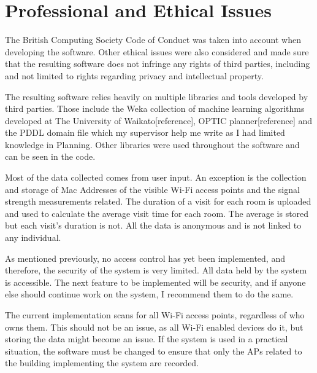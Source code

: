 \chapter{Professional and Ethical Issues}
The British Computing Society Code of Conduct was taken into account when developing the software. Other ethical issues were also considered and made sure that the resulting software does not infringe any rights of third parties, including and not limited to rights regarding privacy and intellectual property. 

The resulting software relies heavily on multiple libraries and tools developed by third parties. Those include the Weka collection of machine learning algorithms developed at The University of Waikato[reference], OPTIC planner[reference] and the PDDL domain file which my supervisor help me write as I had limited knowledge in Planning. Other libraries were used throughout the software and can be seen in the code. 

Most of the data collected comes from user input. An exception is the collection and storage of Mac Addresses of the visible Wi-Fi access points and the signal strength measurements related. The duration of a visit for each room is uploaded and used to calculate the average visit time for each room. The average is stored but each visit's duration is not. All the data is anonymous and is not linked to any individual. 

As mentioned previously, no access control has yet been implemented, and therefore, the security of the system is very limited. All data held by the system is accessible. The next feature to be implemented will be security, and if anyone else should continue work on the system, I recommend them to do the same.

The current implementation scans for all Wi-Fi access points, regardless of who owns them. This should not be an issue, as all Wi-Fi enabled devices do it, but storing the data might become an issue. If the system is used in a practical situation, the software must be changed to ensure that only the APs related to the building implementing the system are recorded.

  